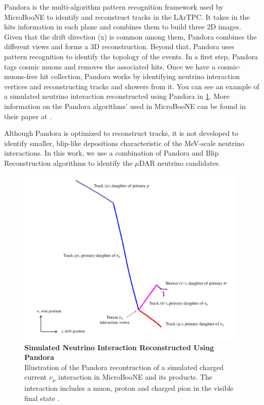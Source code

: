 Pandora is the multi-algorithm pattern recognition framework used by MicroBooNE to identify and reconstruct tracks in the LArTPC. It takes in the hits information in each plane and combines them to build three 2D images. Given that the drift direction (x) is common among them, Pandora combines the different views and forms a 3D reconstruction. Beyond that, Pandora uses pattern recognition to identify the topology of the events. In a first step, Pandora tags cosmic muons and removes the associated hits. Once we have a cosmic-muons-free hit collection, Pandora works by identifying neutrino interaction vertices and reconstructing tracks and showers from it. You can see an example of a simulated neutrino interaction reconstructed using Pandora in \ref{pandora}. More information on the Pandora algorithms' used in MicroBooNE can be found in their paper at \cite{pandora}.

Although Pandora is optimized to reconstruct tracks, it is not developed to identify smaller, blip-like depositions characteristic of the MeV-scale neutrino interactions. In this work, we use a combination of Pandora and Blip Reconstruction algorithms to identify the $\mu$DAR neutrino candidates. 

\begin{figure}[h!]
    \centering
    \includegraphics[width=110mm]{Figures/pandora.jpeg}
    \caption[Simulated Neutrino Interaction Reconstructed Using Pandora]{{\textbf{Simulated Neutrino Interaction Reconstructed Using Pandora}}\\ Illustration of the Pandora recontruction of a simulated charged current $\nu_{\mu}$ interaction in MicroBooNE and its products. The interaction includes a muon, proton and charged pion in the visible final state \cite{pandora}.}
    \label{pandora}
\end{figure}

